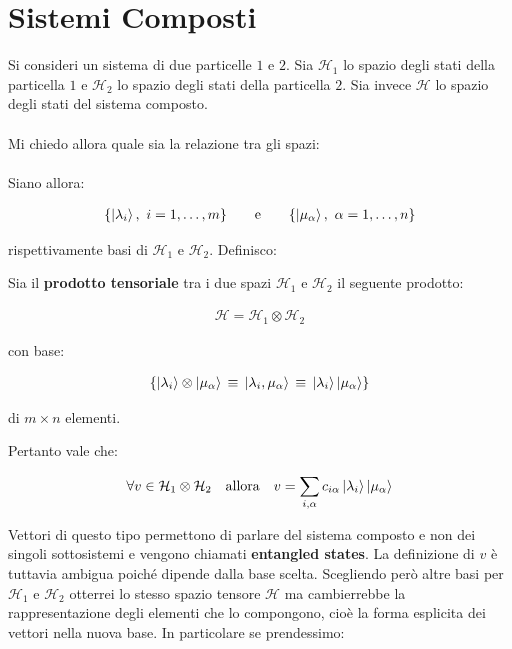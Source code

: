 \section{Sistemi Composti}

	Si consideri un sistema di due particelle $1$ e $2$. Sia $\mathcal{H}_1$ lo spazio degli stati della particella $1$ e $\mathcal{H}_2$ lo spazio degli stati della particella $2$. Sia invece $\mathcal{H}$ lo spazio degli stati del sistema composto. 
	\\
	\\
	Mi chiedo allora quale sia la relazione tra gli spazi:
	\\
	\\
	Siano allora:
	
\begin{align*}
	\qty{ \ket{\lambda_i}, \, \, i =1, \ldots, m } \qquad \text{e} \qquad \qty{ \ket{\mu_{\alpha}}, \, \, \alpha =1, \ldots, n }
\end{align*}

	rispettivamente basi di $\mathcal{H}_1$ e $\mathcal{H}_2$. Definisco:
	
\begin{mydef}
	Sia il \textbf{prodotto tensoriale} tra i due spazi $\mathcal{H}_1$ e $\mathcal{H}_2$ il seguente prodotto:
	
\begin{align*}
	\mathcal{H} = \mathcal{H}_1 \otimes \mathcal{H}_2
\end{align*}

	con base:
	
\begin{align*}
	\qty{ \ket{\lambda_i} \otimes \ket{\mu_{\alpha}}  \, \equiv \, \ket{\lambda_i, \mu_{\alpha}} \, \equiv \, \ket{\lambda_i} \ket{\mu_{\alpha}} }
\end{align*}

	di $m \times n$ elementi.

\end{mydef}

	Pertanto vale che:

\begin{nb}
\begin{align*}
	\forall v \in \mathcal{H}_1 \otimes \mathcal{H}_2 \quad \text{allora} \quad v = \sum_{i, \alpha} c_{i\alpha} \ket{\lambda_i} \ket{\mu_{\alpha}}
\end{align*}
\end{nb}

	Vettori di questo tipo permettono di parlare del sistema composto e non dei singoli sottosistemi e vengono chiamati \textbf{entangled states}. La definizione di $v$ è tuttavia ambigua poiché dipende dalla base scelta. Scegliendo però altre basi per $\mathcal{H}_1$ e $\mathcal{H}_2$ otterrei lo stesso spazio tensore $\mathcal{H}$ ma cambierrebbe la rappresentazione degli elementi che lo compongono, cioè la forma esplicita dei vettori nella nuova base. In particolare se prendessimo:
	
